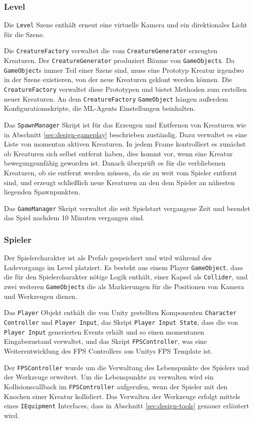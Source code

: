 \subsubsection{Level}
Die \texttt{Level} Szene enthält erneut eine virtuelle Kamera und ein direktionales Licht für die Szene.

Die \texttt{CreatureFactory} verwaltet die vom \texttt{CreatureGenerator} erzeugten Kreaturen.
Der \texttt{CreatureGenerator} produziert Bäume von \texttt{GameObjects}.
Da \texttt{GameObject}s immer Teil einer Szene sind, muss eine Prototyp Kreatur irgendwo in der Szene existieren, von der neue Kreaturen geklont werden können.
Die \texttt{CreatureFactory} verwaltet diese Prototypen und bietet Methoden zum erstellen neuer Kreaturen.
An dem \texttt{CreatureFactory} \texttt{GameObject} hängen außerdem Konfigurationsskripte, die ML-Agents Einstellungen beinhalten.

Das \texttt{SpawnManager} Skript ist für das Erzeugen und Entfernen von Kreaturen wie in Abschnitt \ref{sec:design-gameplay} beschrieben zuständig.
Dazu verwaltet es eine Liste von momentan aktiven Kreaturen.
In jedem Frame kontrolliert es zunächst ob Kreaturen sich selbst entfernt haben, dies kommt vor, wenn eine Kreatur bewegungsunfähig geworden ist.
Danach überprüft es für die verbliebenen Kreaturen, ob sie entfernt werden müssen, da sie zu weit vom Spieler entfernt sind, und erzeugt schließlich neue Kreaturen an den dem Spieler an nähesten liegenden Spawnpunkten.

Das \texttt{GameManager} Skript verwaltet die seit Spielstart vergangene Zeit und beendet das Spiel nachdem 10 Minuten vergangen sind.

\subsubsection{Spieler}
\begin{sloppypar}
Der Spielercharakter ist als Prefab gespeichert und wird während des Ladevorgangs im Level platziert.
Es besteht aus einem Player \texttt{Game\-Object}, dass die für den Spielercharakter nötige Logik enthält, einer Kapsel als \texttt{Collider}, und zwei weiteren \texttt{Game\-Objects} die als Markierungen für die Positionen von Kamera und Werkzeugen dienen.

Das \texttt{Player} Objekt enthält die von Unity gestellten Komponenten \texttt{Character Controller} und \texttt{Player Input}, das Skript \texttt{Player Input State}, dass die von \texttt{Player Input} generierten Events erhält und so einen momentanen Eingabezustand verwaltet, und das Skript \texttt{FPS\-Controller}, was eine Weiterentwicklung des FPS Controllers aus Unitys FPS Template ist.

Der \texttt{FPS\-Controller} wurde um die Verwaltung des Lebenspunkte des Spielers und der Werkzeuge erweitert.
Um die Lebenspunkte zu verwalten wird ein Kollisionscallback im \texttt{FPS\-Controller} aufgerufen, wenn der Spieler mit den Knochen einer Kreatur kollidiert.
Das Verwalten der Werkzeuge erfolgt mittels eines \texttt{IEquipment} Interfaces, dass in Abschnitt \ref{sec:design-tools} genauer erläutert wird.
\end{sloppypar}

